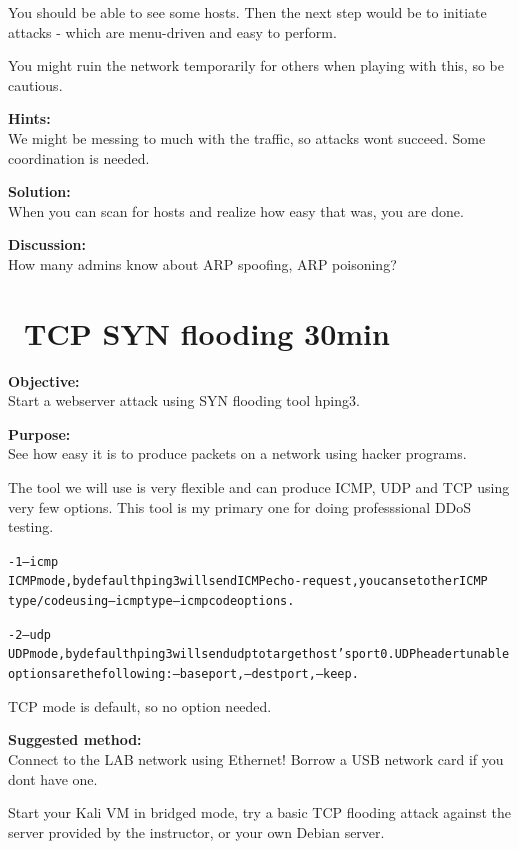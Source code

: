 \documentclass[a4paper,11pt,notitlepage]{report}
\begin{document}
You should be able to see some hosts. Then the next step would be to initiate attacks - which are menu-driven and easy to perform.

You might ruin the network temporarily for others when playing with this, so be cautious.

{\bf Hints:}\\
We might be messing to much with the traffic, so attacks wont succeed. Some coordination is needed.

{\bf Solution:}\\
When you can scan for hosts and realize how easy that was, you are done.

{\bf Discussion:}\\
How many admins know about ARP spoofing, ARP poisoning?


\chapter{\faInfoCircle\ TCP SYN flooding 30min}
\label{ex:syn-flood}

{\bf Objective:}\\
Start a webserver attack using SYN flooding tool hping3.

{\bf Purpose:}\\
See how easy it is to produce packets on a network using hacker programs.

The tool we will use is very flexible and can produce ICMP, UDP and TCP using very few options. This tool is my primary one for doing professsional DDoS testing.

\begin{alltt}\footnotesize
-1 --icmp
       ICMP  mode,  by  default  hping3  will  send  ICMP echo-request, you can set other ICMP
       type/code using --icmptype --icmpcode options.

-2 --udp
       UDP mode, by default hping3 will send udp to target host's port 0.  UDP header  tunable
       options are the following: --baseport, --destport, --keep.
\end{alltt}

TCP mode is default, so no option needed.


{\bf Suggested method:}\\
Connect to the LAB network using Ethernet! Borrow a USB network card if you dont have one.

Start your Kali VM in bridged mode, try a basic TCP flooding attack against the server provided by the instructor, or your own Debian server.
\end{document}
